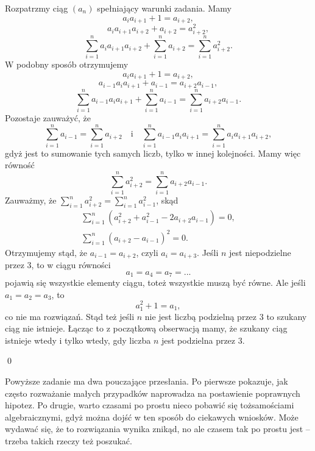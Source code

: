\vspace{10px}
\noindent
Rozpatrzmy ciąg $(a_n)$ spełniający warunki zadania. Mamy
\[
	a_ia_{i + 1} + 1 = a_{i + 2},
\]
\[
	a_ia_{i + 1}a_{i + 2} + a_{i + 2} = a_{i + 2}^2,
\]
\[
	\sum_{i = 1}^{n} a_ia_{i + 1}a_{i + 2} + \sum_{i = 1}^{n} a_{i + 2} = \sum_{i = 1}^{n} a_{i + 2}^2.
\]
W podobny sposób otrzymujemy
\[
	a_ia_{i + 1} + 1 = a_{i + 2},
\]
\[
	a_{i - 1}a_ia_{i + 1} + a_{i - 1} = a_{i + 2}a_{i - 1},
\]
\[
	\sum_{i = 1}^{n} a_{i - 1}a_ia_{i + 1} + \sum_{i = 1}^{n} a_{i - 1} = \sum_{i = 1}^{n} a_{i + 2}a_{i - 1}.
\]
Pozostaje zauważyć, że
\[
	\sum_{i = 1}^{n} a_{i - 1} = \sum_{i = 1}^{n} a_{i + 2} \quad \text{i} \quad \sum_{i = 1}^{n} a_{i - 1}a_ia_{i + 1} = \sum_{i = 1}^{n} a_ia_{i + 1}a_{i + 2},
\]
gdyż jest to sumowanie tych samych liczb, tylko w innej kolejności. Mamy więc równość
\[
	\sum_{i = 1}^{n} a_{i + 2}^2 = \sum_{i = 1}^{n} a_{i + 2}a_{i - 1}.
\]
Zauważmy, że $\sum_{i = 1}^{n} a_{i + 2}^2 = \sum_{i = 1}^{n} a_{i - 1}^2$, skąd
\begin{align*}
	\sum_{i = 1}^{n} \left(a_{i + 2}^2 + a_{i - 1}^2 - 2a_{i + 2}a_{i - 1}\right) = 0, \\
	\sum_{i = 1}^{n} \left(a_{i + 2} - a_{i - 1}\right)^2 = 0.
\end{align*}
Otrzymujemy stąd, że $a_{i - 1} = a_{i + 2}$, czyli $a_i = a_{i + 3}$. Jeśli $n$ jest niepodzielne przez $3$, to w ciągu równości
\[
	a_1 = a_4 = a_7 = ...
\]
pojawią się wszystkie elementy ciągu, toteż wszystkie muszą być równe. Ale jeśli ${a_1 = a_2 = a_3}$, to
\[
	a_1^2 + 1 = a_1,
\]
co nie ma rozwiązań. Stąd też jeśli $n$ nie jest liczbą podzielną przez $3$ to szukany ciąg nie istnieje. Łącząc to z początkową obserwacją mamy, że szukany ciąg istnieje wtedy i tylko wtedy, gdy liczba $n$ jest podzielna przez $3$.

\qed

\noindent
Powyższe zadanie ma dwa pouczające przesłania. Po pierwsze pokazuje, jak często rozważanie małych przypadków naprowadza na postawienie poprawnych hipotez. Po drugie, warto czasami po prostu nieco pobawić się tożsamościami algebraicznymi, gdyż można dojść w ten sposób do ciekawych wniosków. Może wydawać się, że to rozwiązania wynika znikąd, no ale czasem tak po prostu jest -- trzeba takich rzeczy też poszukać.

\vspace{10px}